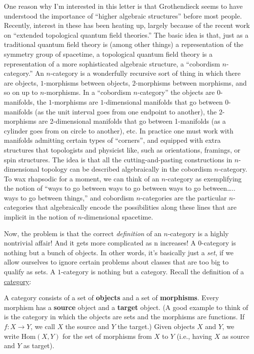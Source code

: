 \documentclass[12pt]{article}
\begin{document}
One reason why I'm interested in this letter is that Grothendieck seems
to have understood the importance of ``higher algebraic structures''
before most people. Recently, interest in these has been heating up,
largely because of the recent work on ``extended topological quantum
field theories.'' The basic idea is that, just as a traditional quantum
field theory is (among other things) a representation of the symmetry
group of spacetime, a topological quantum field theory is a
representation of a more sophisticated algebraic structure, a
``cobordism \(n\)-category.'' An \(n\)-category is a wonderfully
recursive sort of thing in which there are objects, \(1\)-morphisms
between objects, 2-morphisms between morphisms, and so on up to
\(n\)-morphisms. In a ``cobordism \(n\)-category'' the objects are
0-manifolds, the \(1\)-morphisms are \(1\)-dimensional manifolds that go
between 0-manifolds (as the unit interval goes from one endpoint to
another), the \(2\)-morphisms are 2-dimensional manifolds that go
between 1-manifolds (as a cylinder goes from on circle to another), etc.
In practice one must work with manifolds admitting certain types of
``corners'', and equipped with extra structures that topologists and
physicist like, such as orientations, framings, or spin structures. The
idea is that all the cutting-and-pasting constructions in
\(n\)-dimensional topology can be described algebraically in the
cobordism \(n\)-category. To wax rhapsodic for a moment, we can think of
an \(n\)-category as exemplifying the notion of ``ways to go between
ways to go between ways to go between\ldots.. ways to go between
things,'' and cobordism \(n\)-categories are the particular
\(n\)-categories that algebraically encode the possibilities along these
lines that are implicit in the notion of \(n\)-dimensional spacetime.

Now, the problem is that the correct \emph{definition} of an
\(n\)-category is a highly nontrivial affair! And it gets more
complicated as n increases! A 0-category is nothing but a bunch of
objects. In other words, it's basically just a \emph{set}, if we allow
ourselves to ignore certain problems about classes that are too big to
qualify as sets. A \(1\)-category is nothing but a category. Recall the
definition of a
\href{http://math.ucr.edu/home/baez/categories.html}{category}:

A category consists of a set of \textbf{objects} and a set of
\textbf{morphisms}. Every morphism has a \textbf{source} object and a
\textbf{target} object. (A good example to think of is the category in
which the objects are sets and the morphisms are functions. If
\(f\colon X\to Y\), we call \(X\) the source and \(Y\) the target.)
Given objects \(X\) and \(Y\), we write \(\mathrm{Hom}(X,Y)\) for the
set of morphisms from \(X\) to \(Y\) (i.e., having \(X\) as source and
\(Y\) as target).
\end{document}
